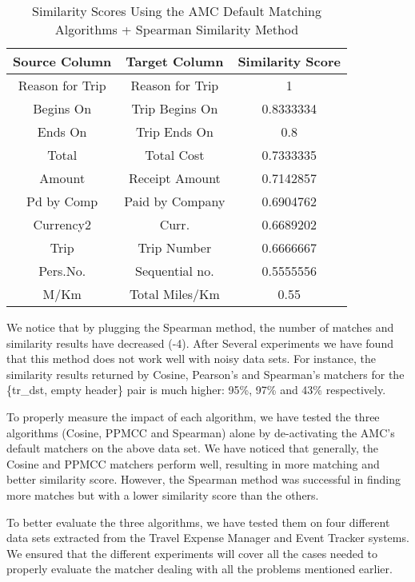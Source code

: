 \begin{table}[ht]
\centering
\begin{tabular}{|c|c|c|} \hline
\textbf{Source Column} & \textbf{Target Column} & \textbf{Similarity Score} \\ \hline
Reason for Trip & Reason for Trip & 1 \\ \hline
Begins On & Trip Begins On & 0.8333334 \\ \hline
Ends On & Trip Ends On & 0.8 \\ \hline
Total & Total Cost & 0.7333335 \\ \hline
Amount & Receipt Amount & 0.7142857 \\ \hline
Pd by Comp & Paid by Company & 0.6904762 \\ \hline
Currency2 & Curr. & 0.6689202 \\ \hline
Trip & Trip Number & 0.6666667 \\ \hline
Pers.No. & Sequential no. & 0.5555556 \\ \hline
M/Km & Total Miles/Km & 0.55 \\ \hline
\end{tabular}
\caption{ Similarity Scores Using the AMC Default Matching Algorithms + Spearman Similarity Method}
\label{tab:Similarity_Scores_Using_the_AMC_Default_Matching_Algorithms_+_Spearman_Similarity_Method}
\end{table}

We notice that by plugging the Spearman method, the number of matches and similarity results have decreased (-4). After Several experiments we have found that this method does not work well with noisy data sets. For instance, the similarity results returned by Cosine, Pearson's and Spearman's matchers for the \{tr\_dst, empty header\} pair is much higher: 95\%, 97\% and 43\% respectively.

To properly measure the impact of each algorithm, we have tested the three algorithms (Cosine, PPMCC and Spearman) alone by de-activating the AMC's default matchers on the above data set. We have noticed that generally, the Cosine and PPMCC matchers perform well, resulting in more matching and better similarity score. However, the Spearman method was successful in finding more matches but with a lower similarity score than the others.

To better evaluate the three algorithms, we have tested them on four different data sets extracted from the Travel Expense Manager and Event Tracker systems. We ensured that the different experiments will cover all the cases needed to properly evaluate the matcher dealing with all the problems mentioned earlier.


